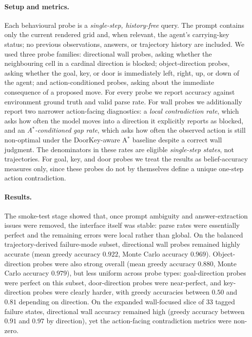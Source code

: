 \paragraph{Setup and metrics.}
Each behavioural probe is a \emph{single-step, history-free} query. The prompt contains only
the current rendered grid and, when relevant, the agent's carrying-key status; no previous
observations, answers, or trajectory history are included. We used three probe families:
directional wall probes, asking whether the neighbouring cell in a cardinal direction is
blocked; object-direction probes, asking whether the goal, key, or door is immediately left,
right, up, or down of the agent; and action-conditioned probes, asking about the immediate
consequence of a proposed move. For every probe we report accuracy against environment ground
truth and valid parse rate. For wall probes we additionally report two narrower
action-facing diagnostics: a \emph{local contradiction rate}, which asks how often the model
moves into a direction it explicitly reports as blocked, and an \emph{A$^*$-conditioned gap
rate}, which asks how often the observed action is still non-optimal under the DoorKey-aware
A$^*$ baseline despite a correct wall judgment. The denominators in these rates are eligible
\emph{single-step states}, not trajectories.
For goal, key, and door probes we treat the results as belief-accuracy measures only, since
these probes do not by themselves define a unique one-step action contradiction.

\paragraph{Results.}
The smoke-test stage showed that, once prompt ambiguity and answer-extraction issues were
removed, the interface itself was stable: parse rates were essentially perfect and the
remaining errors were local rather than global. On the balanced trajectory-derived
failure-mode subset, directional wall probes remained highly accurate (mean greedy accuracy
$0.922$, Monte Carlo accuracy $0.969$). Object-direction probes were also strong overall
(mean greedy accuracy $0.880$, Monte Carlo accuracy $0.979$), but less uniform across probe
types: goal-direction probes were perfect on this subset, door-direction probes were
near-perfect, and key-direction probes were clearly harder, with greedy accuracies between
$0.50$ and $0.81$ depending on direction. On the expanded wall-focused slice of 33 tagged
failure states, directional wall accuracy remained high (greedy accuracy between $0.91$ and
$0.97$ by direction), yet the action-facing contradiction metrics were non-zero.

